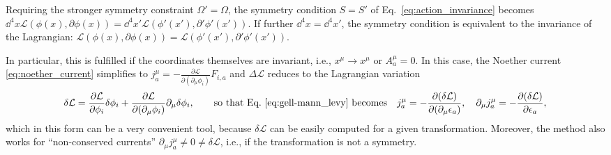 \documentclass[11pt]{latex/exercise}
\begin{document}
Requiring the stronger symmetry constraint $\Omega' = \Omega$, the symmetry condition $S=S'$ of Eq.~\eqref{eq:action_invariance} becomes
$\dd^4 x \mathcal{L}(\phi(x), \partial \phi(x)) = \dd^4 x' \mathcal{L}(\phi'(x'), \partial' \phi'(x'))$. If further $\dd^4 x = \dd^4 x'$, the symmetry condition is equivalent to the invariance of the Lagrangian: $\mathcal{L}(\phi(x), \partial \phi(x)) = \mathcal{L}(\phi'(x'), \partial' \phi'(x'))$.

In particular, this is fulfilled if the coordinates themselves are invariant, i.e., $x^\mu \rightarrow x^\mu$ or $A_a^\mu = 0$.
In this case, the Noether current \eqref{eq:noether_current} simplifies to $j^\mu_a = -\frac{\partial \mathcal{L}}{\partial (\partial_\mu \phi_i)} F_{i,a}$ and $\Delta \mathcal{L}$ reduces to the Lagrangian variation
\begin{align}
    \delta \mathcal{L} = \frac{\partial \mathcal{L}}{\partial \phi_i} \delta \phi_i + \frac{\partial \mathcal{L}}{\partial(\partial_\mu \phi_i)} \partial_\mu \delta \phi_i,
    \qquad \text{so that Eq.~\eqref{eq:gell-mann_levy} becomes} \quad
    j^\mu_a = -\frac{\partial(\delta \mathcal{L})}{\partial(\partial_\mu \epsilon_a)},\quad
    \partial_\mu j^\mu_a = -\frac{\partial(\delta \mathcal{L})}{\partial \epsilon_a} ,
\end{align}
which in this form can be a very convenient tool, because $\delta \mathcal{L}$ can be easily computed for a given transformation. Moreover, the method also works for ``non-conserved currents'' $\partial_\mu j^\mu_a \neq 0 \neq \delta \mathcal{L}$, i.e., if the transformation is not a symmetry.
\end{document}
